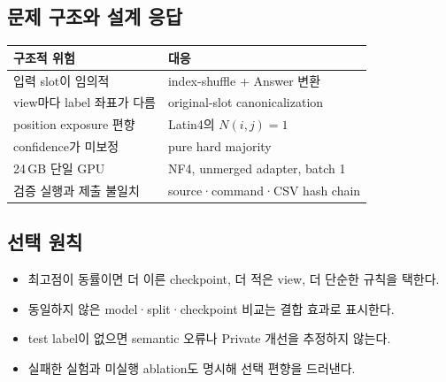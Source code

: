 \documentclass[9pt,a4paper]{extarticle}
\begin{document}
\begin{multicols}{2}
\subsection*{문제 구조와 설계 응답}
\begin{tabularx}{\linewidth}{@{}Y Y@{}}
\toprule
구조적 위험 & 대응\\
\midrule
입력 slot이 임의적 & index-shuffle + Answer 변환\\
view마다 label 좌표가 다름 & original-slot canonicalization\\
position exposure 편향 & Latin4의 $N(i,j)=1$\\
confidence가 미보정 & pure hard majority\\
24\,GB 단일 GPU & NF4, unmerged adapter, batch 1\\
검증 실행과 제출 불일치 & source·command·CSV hash chain\\
\bottomrule
\end{tabularx}

\subsection*{선택 원칙}
\begin{itemize}
\item 최고점이 동률이면 더 이른 checkpoint, 더 적은 view, 더 단순한 규칙을 택한다.
\item 동일하지 않은 model·split·checkpoint 비교는 결합 효과로 표시한다.
\item test label이 없으면 semantic 오류나 Private 개선을 추정하지 않는다.
\item 실패한 실험과 미실행 ablation도 명시해 선택 편향을 드러낸다.
\end{itemize}

\end{multicols}

\newpage
\end{document}
